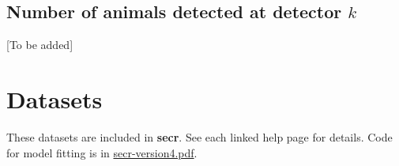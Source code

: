 \documentclass[
]{book}
\begin{document}
\section{\texorpdfstring{Number of animals detected at detector \(k\)}{Number of animals detected at detector k}}\label{number-of-animals-detected-at-detector-k}

{[}To be added{]}

\chapter{Datasets}\label{Datasets}

These datasets are included in \textbf{secr}. See each linked help page for details. Code for model fitting is in \href{https://www.otago.ac.nz/density/pdfs/secr-version4.pdf}{secr-version4.pdf}.
\end{document}
